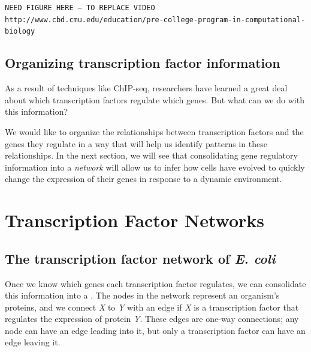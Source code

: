 \texttt{NEED FIGURE HERE -- TO REPLACE VIDEO http://www.cbd.cmu.edu/education/pre-college-program-in-computational-biology}\\

\begin{qbox}\end{qbox} 


\FloatBarrier
{}
\subsection{Organizing transcription factor information}

As a result of techniques like ChIP-seq, researchers have learned a great deal about which transcription factors regulate which genes. But what can we do with this information?

We would like to organize the relationships between transcription factors and the genes they regulate in a way that will help us identify patterns in these relationships. In the next section, we will see that consolidating gene regulatory information into a \textit{network} will allow us to infer how cells have evolved to quickly change the expression of their genes in response to a dynamic environment.


\FloatBarrier
{}

\section{Transcription Factor Networks}
\label{sec:transcription_factor_networks}

\subsection{The transcription factor network of \textit{E. coli}}

Once we know which genes each transcription factor regulates, we can consolidate this information into a . The nodes in the network represent an organism's proteins, and we connect \textit{X} to \textit{Y} with an edge if \textit{X} is a transcription factor that regulates the expression of protein \textit{Y}. These edges are one-way connections; any node can have an edge leading into it, but only a transcription factor can have an edge leaving it.

